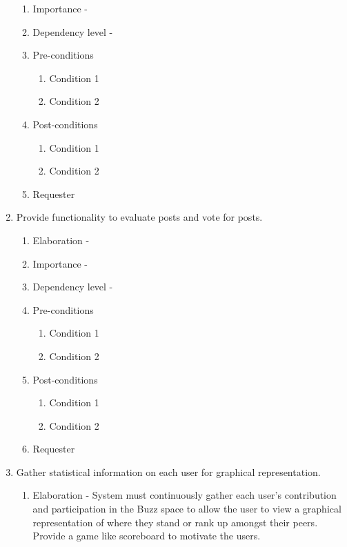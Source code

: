 \documentclass[12pt]{article}
\begin{document}
\begin{enumerate}
\begin{enumerate}
    \item Importance - 
    \item Dependency level - 
    \item Pre-conditions
    \begin{enumerate}
    	\item Condition 1
    	\item Condition 2
    \end{enumerate}
        \item Post-conditions
    \begin{enumerate}
    	\item Condition 1
    	\item Condition 2
    \end{enumerate}
    \item Requester
  \end{enumerate}
\newpage %
   \item  Provide functionality to evaluate posts and vote for posts. %
  \begin{enumerate}
    \item Elaboration - 
    \item Importance - 
    \item Dependency level - 
    \item Pre-conditions
    \begin{enumerate}
    	\item Condition 1
    	\item Condition 2
    \end{enumerate}
        \item Post-conditions
    \begin{enumerate}
    	\item Condition 1
    	\item Condition 2
    \end{enumerate}
    \item Requester
  \end{enumerate}
\newpage %
   \item Gather statistical information on each user for graphical representation. %
  \begin{enumerate}
    \item Elaboration - System must continuously gather each user’s contribution and participation in the Buzz space to allow the user to view a graphical representation of where they stand or rank up amongst their peers. Provide a game like scoreboard to motivate the users.

\end{enumerate}
\end{enumerate}
\end{document}
